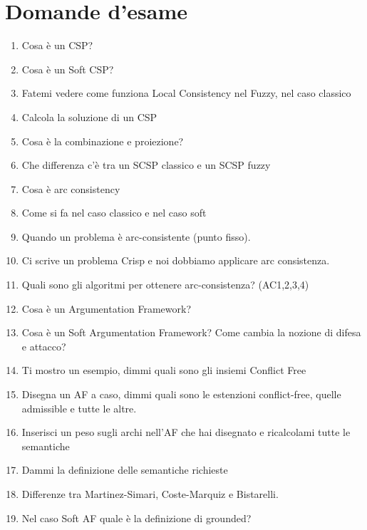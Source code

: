 \section{Domande d'esame}
\begin{enumerate}
    \item Cosa è un CSP?
    \item Cosa è un Soft CSP?
    \item Fatemi vedere come funziona Local Consistency nel Fuzzy, nel caso classico
    \item Calcola la soluzione di un CSP
    \item Cosa è la combinazione e proiezione?
    \item Che differenza c’è tra un SCSP classico e un SCSP fuzzy
    \item Cosa è arc consistency
    \item Come si fa nel caso classico e nel caso soft
    \item Quando un problema è arc-consistente (punto fisso).
    \item Ci scrive un problema Crisp e noi dobbiamo applicare arc consistenza.
    \item Quali sono gli algoritmi per ottenere arc-consistenza? (AC1,2,3,4)
    \item Cosa è un Argumentation Framework?
    \item Cosa è un Soft Argumentation Framework? Come cambia la nozione di difesa e attacco?
    \item Ti mostro un esempio, dimmi quali sono gli insiemi Conflict Free
    \item Disegna un AF a caso, dimmi quali sono le estenzioni conflict-free, quelle admissible e tutte le altre.
    \item Inserisci un peso sugli archi nell’AF che hai disegnato e ricalcolami tutte le semantiche
    \item Dammi la definizione delle semantiche richieste
    \item Differenze tra Martinez-Simari, Coste-Marquiz e Bistarelli.
    \item Nel caso Soft AF quale è la definizione di grounded?
\end{enumerate}   
    


